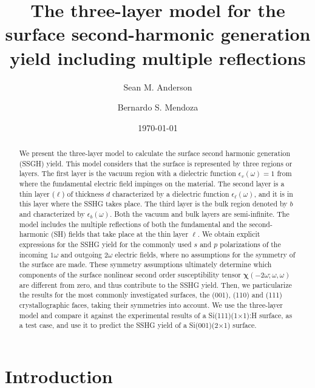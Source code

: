 \documentclass[aps,prb,10pt,showpacs,letterpaper,twocolumn]{revtex4-1}
\begin{document}
\title{The three-layer model for the surface second-harmonic generation yield
including multiple reflections}
\author{Sean M. Anderson}
\author{Bernardo S. Mendoza}
\date{\today}

\begin{abstract}
We present the three-layer model to calculate the surface second harmonic
generation (SSGH) yield. This model considers that the surface is represented by
three regions or layers. The first layer is the vacuum region with a dielectric
function $\epsilon_{v}(\omega)=1$ from where the fundamental electric field
impinges on the material. The second layer is a thin layer ($\ell$) of thickness
$d$ characterized by a dielectric function $\epsilon_{\ell}(\omega)$, and it is
in this layer where the SSHG takes place. The third layer is the bulk region
denoted by $b$ and characterized by $\epsilon_{b}(\omega)$. Both the vacuum and
bulk layers are semi-infinite. The model includes the multiple reflections of
both the fundamental and the second-harmonic (SH) fields that take place at the
thin layer $\ell$. We obtain explicit expressions for the SSHG yield for the
commonly used $s$ and $p$ polarizations of the incoming $1\omega$ and outgoing
$2\omega$ electric fields, where no assumptions for the symmetry of the surface
are made. These symmetry assumptions ultimately determine which components of
the surface nonlinear second order susceptibility tensor
$\boldsymbol{\chi}(-2\omega;\omega,\omega)$ are different from zero, and thus
contribute to the SSHG yield. Then, we particularize the results for  the most
commonly investigated surfaces, the (001), (110) and (111) crystallographic
faces, taking their symmetries into account. We use the three-layer model and
compare it against the experimental results of a Si(111)(1$\times$1):H surface,
as a test case, and use it to predict the SSHG yield of a Si(001)(2$\times$1)
surface.
\end{abstract}


\maketitle

\section{Introduction}\label{sec:intro}
\end{document}
